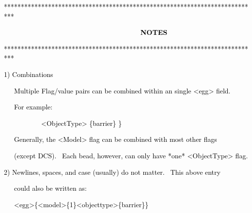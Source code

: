 \documentclass[a4paper]{article}
\newcommand\textstyleOOoComputerKeyWord[1]{\textrm{\textcolor[rgb]{0.0,0.0,0.5019608}{#1}}}
\begin{document}
\bigskip

{\color{black}
\textstyleOOoComputerKeyWord{\textcolor{black}{***************************************************************************}}}

{\bfseries
\hypertarget{RefHeading7924869075401}{}\textstyleOOoComputerKeyWord{\textcolor{black}{\ \ \ \ \ \ \ \ \ \ \ \ \ \ \ \ \ \ \ \ \ \ \ \ \ \ \ \ \ \ \ \ \ \ \ NOTES}}}

{\color{black}
\textstyleOOoComputerKeyWord{\textcolor{black}{***************************************************************************}}}


\bigskip

{\color{black}
\textstyleOOoComputerKeyWord{\textcolor{black}{1) Combinations}}}


\bigskip

{\color{black}
\textstyleOOoComputerKeyWord{\textcolor{black}{\ \ \ Multiple Flag/value pairs can be combined within an single
{\textless}egg{\textgreater} field.}}}

{\color{black}
\textstyleOOoComputerKeyWord{\textcolor{black}{\ \ \ For example:}}}

\clearpage{\color{black}
\textstyleOOoComputerKeyWord{\textcolor{black}{{\textless}egg{\textgreater} \{ {\textless}Model{\textgreater} \{1\}
\ }}}

{\color{black}
\textstyleOOoComputerKeyWord{\textcolor{black}{\ \ \ \ \ \ \ \ \ \ \ {\textless}ObjectType{\textgreater} \{barrier\}
\}}}}


\bigskip

{\color{black}
\textstyleOOoComputerKeyWord{\textcolor{black}{\ \ \ Generally, the {\textless}Model{\textgreater} flag can be combined
with most other flags}}}

{\color{black}
\textstyleOOoComputerKeyWord{\textcolor{black}{\ \ \ (except DCS). \ Each bead, however, can only have *one*
{\textless}ObjectType{\textgreater} flag.}}}


\bigskip

{\color{black}
\textstyleOOoComputerKeyWord{\textcolor{black}{2) Newlines, spaces, and case (usually) do not matter. \ This above
entry}}}

{\color{black}
\textstyleOOoComputerKeyWord{\textcolor{black}{\ \ \ could also be written as:}}}


\bigskip

{\color{black}
\textstyleOOoComputerKeyWord{\textcolor{black}{\ \ \ {\textless}egg{\textgreater}\{{\textless}model{\textgreater}\{1\}{\textless}objecttype{\textgreater}\{barrier\}\}}}}
\end{document}
